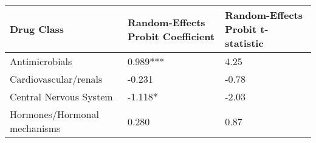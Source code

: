 \documentclass[
]{book}
\begin{document}
\begin{longtable}[]{@{}lll@{}}
\toprule
\begin{minipage}[b]{0.31\columnwidth}\raggedright
Drug Class\strut
\end{minipage} & \begin{minipage}[b]{0.30\columnwidth}\raggedright
Random-Effects Probit Coefficient\strut
\end{minipage} & \begin{minipage}[b]{0.30\columnwidth}\raggedright
Random-Effects Probit t-statistic\strut
\end{minipage}\tabularnewline
\midrule
\endhead
\begin{minipage}[t]{0.31\columnwidth}\raggedright
Antimicrobials\strut
\end{minipage} & \begin{minipage}[t]{0.30\columnwidth}\raggedright
0.989***\strut
\end{minipage} & \begin{minipage}[t]{0.30\columnwidth}\raggedright
4.25\strut
\end{minipage}\tabularnewline
\begin{minipage}[t]{0.31\columnwidth}\raggedright
Cardiovascular/renals\strut
\end{minipage} & \begin{minipage}[t]{0.30\columnwidth}\raggedright
-0.231\strut
\end{minipage} & \begin{minipage}[t]{0.30\columnwidth}\raggedright
-0.78\strut
\end{minipage}\tabularnewline
\begin{minipage}[t]{0.31\columnwidth}\raggedright
Central Nervous System\strut
\end{minipage} & \begin{minipage}[t]{0.30\columnwidth}\raggedright
-1.118*\strut
\end{minipage} & \begin{minipage}[t]{0.30\columnwidth}\raggedright
-2.03\strut
\end{minipage}\tabularnewline
\begin{minipage}[t]{0.31\columnwidth}\raggedright
Hormones/Hormonal mechanisms\strut
\end{minipage} & \begin{minipage}[t]{0.30\columnwidth}\raggedright
0.280\strut
\end{minipage} & \begin{minipage}[t]{0.30\columnwidth}\raggedright
0.87\strut

\end{minipage}
\end{longtable}
\end{document}
